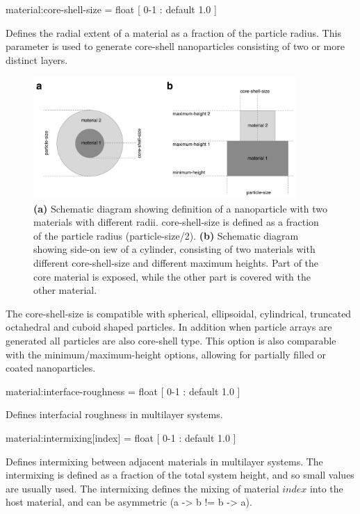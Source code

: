 {\zicf material:core-shell-size = float [ 0-1 : default 1.0 ]} Defines the radial extent of a material as a fraction of the particle radius. This parameter is used to generate core-shell nanoparticles consisting of two or more distinct layers.

\begin{figure}[!htb]
\center
\includegraphics[width=10cm]{figures/core-shell.pdf}
\caption{\textbf{(a)} Schematic diagram showing definition of a nanoparticle with two materials with different radii. core-shell-size is defined as a fraction of the particle radius (particle-size/2). \textbf{(b)} Schematic diagram showing side-on iew of a cylinder, consisting of two materials with different core-shell-size and different maximum heights. Part of the core material is exposed, while the other part is covered with the other material.}
\label{fig:core-shell}
\end{figure}

The core-shell-size is compatible with spherical, ellipsoidal, cylindrical, truncated octahedral and cuboid shaped particles. In addition when particle arrays are generated all particles are also core-shell type. This option is also comparable with the minimum/maximum-height options, allowing for partially filled or coated nanoparticles.

{\zicf material:interface-roughness = float [ 0-1 : default 1.0 ]} Defines interfacial roughness in multilayer systems.

{\zicf material:intermixing[index] = float [ 0-1 : default 1.0 ]} Defines intermixing between adjacent materials in multilayer systems. The intermixing is defined as a fraction of the total system height, and so small values are usually used. The intermixing defines the mixing of material $index$ into the host material, and can be asymmetric (a -> b != b -> a).

